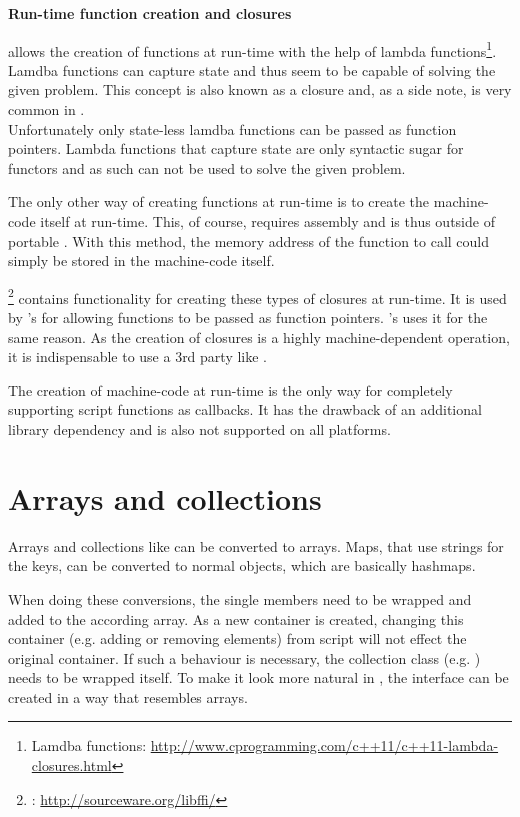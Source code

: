 \textbf{Run-time function creation and closures}

 allows the creation of functions at run-time with the help of lambda functions\footnote{Lamdba functions: \url{http://www.cprogramming.com/c++11/c++11-lambda-closures.html}}. Lamdba functions can capture state and thus seem to be capable of solving the given problem. This concept is also known as a closure and, as a side note, is very common in .
\\Unfortunately only state-less lamdba functions can be passed as function pointers. Lambda functions that capture state are only syntactic sugar for functors and as such can not be used to solve the given problem.

The only other way of creating functions at run-time is to create the machine-code itself at run-time. This, of course, requires assembly and is thus outside of portable . With this method, the memory address of the  function to call could simply be stored in the machine-code itself.

\footnote{: \url{http://sourceware.org/libffi/}} contains functionality for creating these types of closures at run-time. It is used by 's  for allowing  functions to be passed as  function pointers. 's  uses it for the same reason. As the creation of closures is a highly machine-dependent operation, it is indispensable to use a 3rd party like .

The creation of machine-code at run-time is the only way for completely supporting script functions as callbacks. It has the drawback of an additional library dependency and is also not supported on all platforms.

\section{Arrays and collections}

Arrays and collections like  can be converted to  arrays. Maps, that use strings for the keys, can be converted to normal  objects, which are basically hashmaps.

When doing these conversions, the single members need to be wrapped and added to the according  array. As a new  container is created, changing this container (e.g. adding or removing elements) from script will not effect the original  container. If such a behaviour is necessary, the collection class (e.g. ) needs to be wrapped itself. To make it look more natural in , the interface can be created in a way that resembles  arrays.

